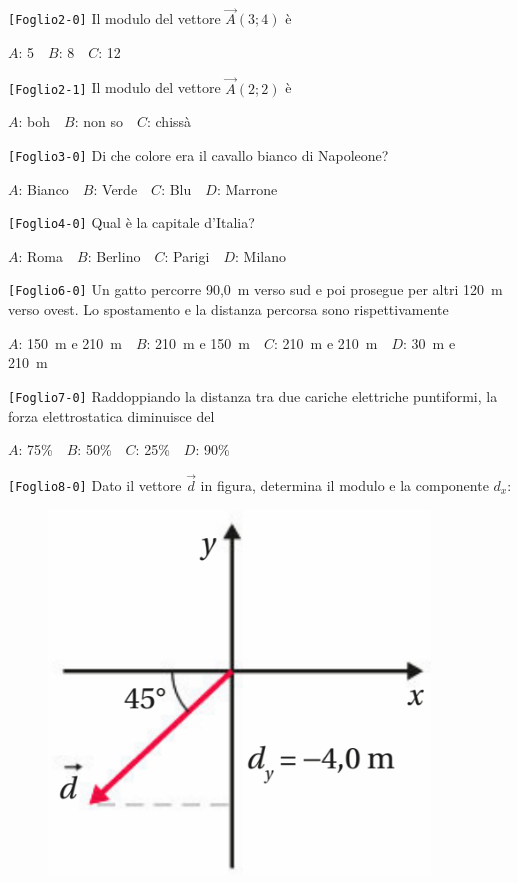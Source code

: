

\noindent
{\tt [{Foglio2-0}]} Il modulo del vettore $\vec{A}(3;4)$ è

{$A$}: 5\ \ 
{$B$}: 8\ \ 
{$C$}: 12\ \ 


\noindent
{\tt [{Foglio2-1}]} Il modulo del vettore $\vec{A}(2;2)$ è

{$A$}: boh\ \ 
{$B$}: non so\ \ 
{$C$}: chissà\ \ 


\noindent
{\tt [{Foglio3-0}]} Di che colore era il cavallo bianco di Napoleone?

{$A$}: Bianco\ \ 
{$B$}: Verde\ \ 
{$C$}: Blu\ \ 
{$D$}: Marrone\ \ 


\noindent
{\tt [{Foglio4-0}]} Qual è la capitale d’Italia?

{$A$}: Roma\ \ 
{$B$}: Berlino\ \ 
{$C$}: Parigi\ \ 
{$D$}: Milano\ \ 


\noindent
{\tt [{Foglio6-0}]} Un gatto percorre 90,0~m verso sud e poi prosegue per altri 120~m verso ovest. Lo spostamento e la distanza percorsa sono rispettivamente

{$A$}: 150~m e 210~m\ \ 
{$B$}: 210~m e 150~m\ \ 
{$C$}: 210~m e 210~m\ \ 
{$D$}: 30~m e 210~m\ \ 


\noindent
{\tt [{Foglio7-0}]} Raddoppiando la distanza tra due cariche elettriche puntiformi, la forza elettrostatica diminuisce del

{$A$}: 75\%\ \ 
{$B$}: 50\%\ \ 
{$C$}: 25\%\ \ 
{$D$}: 90\%\ \ 


\noindent
{\tt [{Foglio8-0}]} Dato il vettore $\vec{d}$ in figura, determina il modulo e la componente $d_x$: \begin{figure}[h!]   \begin{center}     \includegraphics[scale=0.35]{vettored.png}   \end{center} \end{figure}

